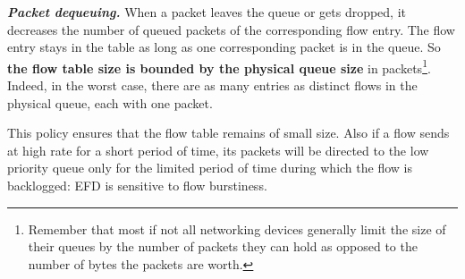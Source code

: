 \documentclass[preprint,12pt]{elsarticle}
\begin{document}


%

\textbf{\textit{Packet dequeuing.}} When a packet leaves the queue or gets dropped, it decreases the number of queued packets of the corresponding flow entry. The flow entry stays in the table as long as one corresponding packet is in the queue. So \textbf{the flow table size is bounded by the physical queue size} in packets\footnote{Remember that most if not all networking devices generally limit the size of their queues by the number of packets they can hold as opposed to the number of bytes the packets are worth.}. Indeed, in the worst case, there are as many entries as distinct flows in the physical queue, each with one packet.

This policy ensures that the flow table remains of small size. Also if a flow sends at high rate for a short period of time, its packets will be directed to the low priority queue only for the limited period of time during which the flow is backlogged:  EFD is sensitive to flow burstiness. 
\end{document}
